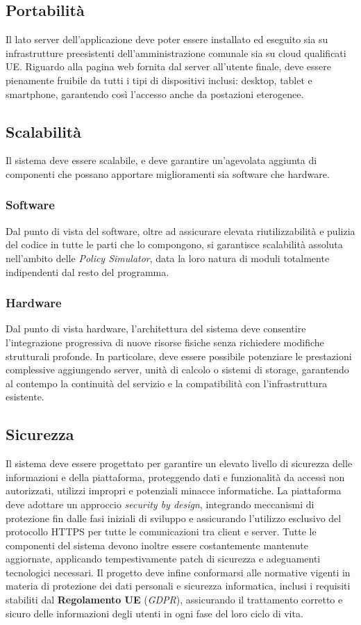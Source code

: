 \subsection{Portabilità}
Il lato server dell'applicazione deve poter essere installato ed eseguito sia su infrastrutture preesistenti dell’amministrazione comunale sia su cloud qualificati UE. Riguardo alla pagina web fornita dal server all'utente finale, deve essere pienamente fruibile da tutti i tipi di dispositivi inclusi: desktop, tablet e smartphone, garantendo così l’accesso anche da postazioni eterogenee.

\subsection{Scalabilità}
Il sistema deve essere scalabile, e deve garantire un’agevolata aggiunta di componenti che possano apportare miglioramenti sia software che hardware.

\subsubsection{Software}
Dal punto di vista del software, oltre ad assicurare elevata riutilizzabilità e pulizia del codice in tutte le parti che lo compongono, si garantisce scalabilità assoluta nell'ambito delle \textit{Policy Simulator}, data la loro natura di moduli totalmente indipendenti dal resto del programma.

\subsubsection{Hardware}
Dal punto di vista hardware, l’architettura del sistema deve consentire l’integrazione progressiva di nuove risorse fisiche senza richiedere modifiche strutturali profonde.  
In particolare, deve essere possibile potenziare le prestazioni complessive aggiungendo server, unità di calcolo o sistemi di storage, garantendo al contempo la continuità del servizio e la compatibilità con l’infrastruttura esistente.  

\subsection{Sicurezza}
Il sistema deve essere progettato per garantire un elevato livello di sicurezza delle informazioni e della piattaforma, proteggendo dati e funzionalità da accessi non autorizzati, utilizzi impropri e potenziali minacce informatiche.  
La piattaforma deve adottare un approccio \textit{security by design}, integrando meccanismi di protezione fin dalle fasi iniziali di sviluppo e assicurando l’utilizzo esclusivo del protocollo HTTPS per tutte le comunicazioni tra client e server.
Tutte le componenti del sistema devono inoltre essere costantemente mantenute aggiornate, applicando tempestivamente patch di sicurezza e adeguamenti tecnologici necessari.  
Il progetto deve infine conformarsi alle normative vigenti in materia di protezione dei dati personali e sicurezza informatica, inclusi i requisiti stabiliti dal \textbf{Regolamento UE} (\textit{GDPR}), assicurando il trattamento corretto e sicuro delle informazioni degli utenti in ogni fase del loro ciclo di vita.

